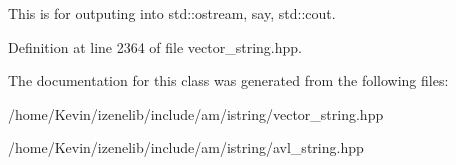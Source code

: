 This is for outputing into std::ostream, say, std::cout. 

Definition at line 2364 of file vector\_\-string.hpp.

The documentation for this class was generated from the following files:\begin{CompactItemize}
\item 
/home/Kevin/izenelib/include/am/istring/vector\_\-string.hpp\item 
/home/Kevin/izenelib/include/am/istring/avl\_\-string.hpp\end{CompactItemize}
